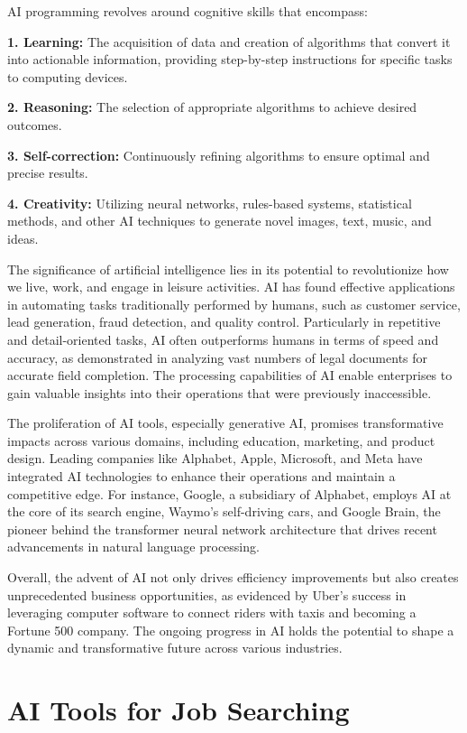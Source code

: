 \documentclass[
]{book}
\begin{document}
AI programming revolves around cognitive skills that encompass:

\textbf{1. Learning:} The acquisition of data and creation of algorithms that convert it into actionable information, providing step-by-step instructions for specific tasks to computing devices.

\textbf{2. Reasoning:} The selection of appropriate algorithms to achieve desired outcomes.

\textbf{3. Self-correction:} Continuously refining algorithms to ensure optimal and precise results.

\textbf{4. Creativity:} Utilizing neural networks, rules-based systems, statistical methods, and other AI techniques to generate novel images, text, music, and ideas.

The significance of artificial intelligence lies in its potential to revolutionize how we live, work, and engage in leisure activities. AI has found effective applications in automating tasks traditionally performed by humans, such as customer service, lead generation, fraud detection, and quality control. Particularly in repetitive and detail-oriented tasks, AI often outperforms humans in terms of speed and accuracy, as demonstrated in analyzing vast numbers of legal documents for accurate field completion. The processing capabilities of AI enable enterprises to gain valuable insights into their operations that were previously inaccessible.

The proliferation of AI tools, especially generative AI, promises transformative impacts across various domains, including education, marketing, and product design. Leading companies like Alphabet, Apple, Microsoft, and Meta have integrated AI technologies to enhance their operations and maintain a competitive edge. For instance, Google, a subsidiary of Alphabet, employs AI at the core of its search engine, Waymo's self-driving cars, and Google Brain, the pioneer behind the transformer neural network architecture that drives recent advancements in natural language processing.

Overall, the advent of AI not only drives efficiency improvements but also creates unprecedented business opportunities, as evidenced by Uber's success in leveraging computer software to connect riders with taxis and becoming a Fortune 500 company. The ongoing progress in AI holds the potential to shape a dynamic and transformative future across various industries.

\hypertarget{ai-tools-for-job-searching}{%
\chapter{AI Tools for Job Searching}\label{ai-tools-for-job-searching}}
\end{document}

